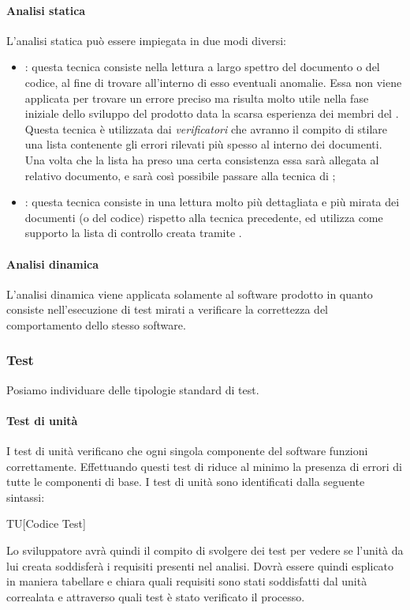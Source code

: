 \paragraph{Analisi statica}
L'analisi statica può essere impiegata in due modi diversi:
\begin{itemize}
  \item \textbf{}: questa tecnica  consiste nella
  lettura a largo spettro del documento o del codice, al fine di trovare all'interno di esso eventuali anomalie. Essa non viene applicata per trovare un errore preciso ma risulta
  molto utile nella fase iniziale dello sviluppo del prodotto data la scarsa
  esperienza dei membri del . Questa tecnica è utilizzata dai \textit{verificatori}
  che avranno il compito di stilare una lista contenente gli errori rilevati più
  spesso al interno dei documenti. Una volta che la lista ha preso una certa consistenza essa sarà allegata al relativo documento, e sarà così possibile passare alla tecnica di ;
  \item \textbf{}: questa tecnica consiste in una
  lettura molto più dettagliata e più mirata dei documenti (o del codice) rispetto alla tecnica precedente, ed utilizza come supporto la lista di controllo creata tramite .
\end{itemize}

\paragraph{Analisi dinamica}
L'analisi dinamica viene applicata solamente al software prodotto in quanto consiste nell'esecuzione di test mirati a verificare la correttezza del comportamento dello stesso software.

\subsubsection{Test}
Posiamo individuare delle tipologie standard di test.

\paragraph{Test di unità}
I test di unità verificano che ogni singola componente del software funzioni correttamente. Effettuando questi test di riduce al minimo la presenza di errori di tutte le componenti di base. I test di unità sono identificati dalla seguente sintassi:
\begin{center}
  TU[Codice Test]
\end{center}
Lo sviluppatore avrà quindi il compito di svolgere dei test per vedere se l'unità da lui creata soddisferà i requisiti presenti nel analisi. Dovrà essere quindi esplicato in maniera tabellare e chiara quali requisiti sono stati soddisfatti dal unità correalata e attraverso quali test è stato verificato il processo.

